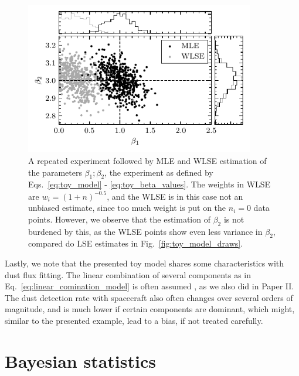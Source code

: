 \begin{figure}[h]
 	\centering
 	\includegraphics[width=10cm]{figures/toy_model_draws_weighted.pdf}
 	\caption{A repeated experiment followed by MLE and WLSE estimation of the parameters $\beta_1; \beta_2$, the experiment as defined by Eqs.~\ref{eq:toy_model} - \ref{eq:toy_beta_values}. The weights in WLSE are $w_i = (1+n)^{-0.5}$, and the WLSE is in this case not an unbiased estimate, since too much weight is put on the $n_i=0$ data points. However, we observe that the estimation of $\beta_2$ is not burdened by this, as the WLSE points show even less variance in $\beta_2$, compared do LSE estimates in Fig.~\ref{fig:toy_model_draws}.}
 	\label{fig:toy_model_draws_weighted}
\end{figure}

Lastly, we note that the presented toy model shares some characteristics with dust flux fitting. The linear combination of several components as in Eq.~\ref{eq:linear_comination_model} is often assumed \citep{szalay2021collisional,zaslavsky2012interplanetary}, as we also did in Paper II. The dust detection rate with spacecraft also often changes over several orders of magnitude, and is much lower if certain components are dominant, which might, similar to the presented example, lead to a bias, if not treated carefully. 

\section{Bayesian statistics}

